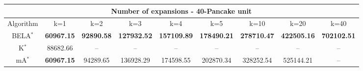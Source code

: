 \begin{tabular}{c|cccccccc}\toprule
\multicolumn{9}{c}{Number of expansions - 40-Pancake unit}\\ \midrule
Algorithm & k=1 & k=2 & k=3 & k=4 & k=5 & k=10 & k=20 & k=40 \\ \midrule
BELA$^*$ & \textbf{60967.15} & \textbf{92890.58} & \textbf{127932.52} & \textbf{157109.89} & \textbf{178490.21} & \textbf{278710.47} & \textbf{422505.16} & \textbf{702102.51} \\
K$^*$ & 88682.66 & -- & -- & -- & -- & -- & -- & -- \\
mA$^*$ & \textbf{60967.15} & 94289.65 & 136928.29 & 174598.55 & 202870.34 & 328252.54 & 525144.21 & -- \\ \bottomrule 
\end{tabular}
